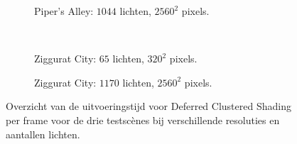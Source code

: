 \begin{figure}[t]
\begin{adjustbox}{minipage=\textwidth, scale=0.55}
    \begin{subfigure}[b]{0.8\textwidth}
      \centering
      \def\svgwidth{\textwidth}
      
      \caption{Piper's Alley: $1044$ lichten, $2560^2$ pixels.}
      \label{fig:cs-frames-stacked:alley-2560}
    \end{subfigure}
  \end{adjustbox} \\
  \begin{adjustbox}{minipage=\textwidth, scale=0.55}
    \begin{subfigure}[b]{0.8\textwidth}
      \centering
      \def\svgwidth{\textwidth}
      
      \caption{Ziggurat City: $65$ lichten, $320^2$ pixels.}
      \label{fig:cs-frames-stacked:city-320}
    \end{subfigure}
  \end{adjustbox}\hspace{-0.075\textwidth}  %
  \begin{adjustbox}{minipage=\textwidth, scale=0.55}
    \begin{subfigure}[b]{0.8\textwidth}
      \centering
      \def\svgwidth{\textwidth}
      
      \caption{Ziggurat City: $1170$ lichten, $2560^2$ pixels.}
      \label{fig:cs-frames-stacked:city-2560}
    \end{subfigure}
  \end{adjustbox}
  \caption{Overzicht van de uitvoeringstijd voor Deferred Clustered Shading per frame voor de
           drie testsc\`enes bij verschillende resoluties en aantallen lichten.}
  \label{fig:cs-frames-stacked}
\end{figure}


